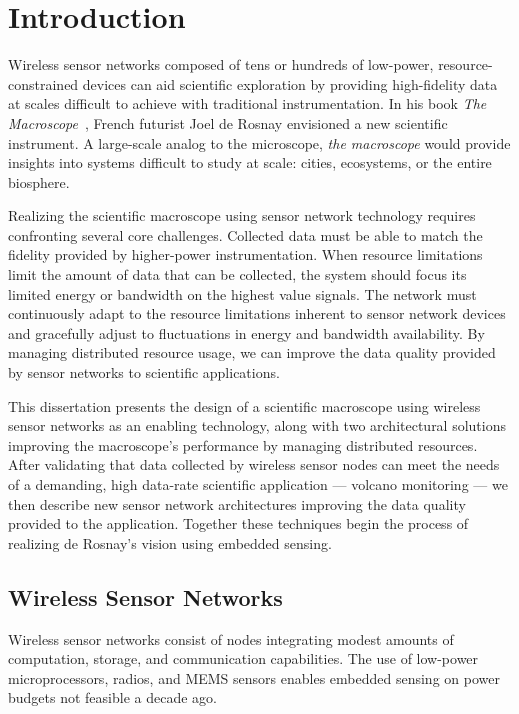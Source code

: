 \chapter{Introduction}
\label{chap-introduction}

Wireless sensor networks composed of tens or hundreds of low-power,
resource-constrained devices can aid scientific exploration by providing
high-fidelity data at scales difficult to achieve with traditional
instrumentation. In his book \textit{The Macroscope}~\cite{rosnay79}, French
futurist Joel de Rosnay envisioned a new scientific instrument. A large-scale
analog to the microscope, \textit{the macroscope} would provide insights into
systems difficult to study at scale: cities, ecosystems, or the entire
biosphere.

Realizing the scientific macroscope using sensor network technology requires
confronting several core challenges. Collected data must be able to match the
fidelity provided by higher-power instrumentation. When resource limitations
limit the amount of data that can be collected, the system should focus its
limited energy or bandwidth on the highest value signals. The network must
continuously adapt to the resource limitations inherent to sensor network
devices and gracefully adjust to fluctuations in energy and bandwidth
availability. By managing distributed resource usage, we can improve the data
quality provided by sensor networks to scientific applications.

This dissertation presents the design of a scientific macroscope using
wireless sensor networks as an enabling technology, along with two
architectural solutions improving the macroscope's performance by managing
distributed resources. After validating that data collected by wireless
sensor nodes can meet the needs of a demanding, high data-rate scientific
application --- volcano monitoring --- we then describe new sensor network
architectures improving the data quality provided to the application.
Together these techniques begin the process of realizing de Rosnay's vision
using embedded sensing.

\section{Wireless Sensor Networks}

Wireless sensor networks consist of nodes integrating modest amounts of
computation, storage, and communication capabilities. The use of low-power
microprocessors, radios, and MEMS sensors enables embedded sensing on power
budgets not feasible a decade ago.

